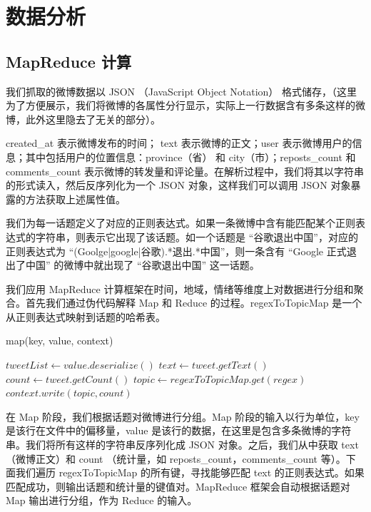 \section{数据分析}
\subsection{MapReduce 计算}
我们抓取的微博数据以 JSON （JavaScript Object Notation）\cite{json} 格式储存，（这里为了方便展示，我们将微博的各属性分行显示，实际上一行数据含有多条这样的微博，此外这里隐去了无关的部分）。



created\_at 表示微博发布的时间； text 表示微博的正文；user 表示微博用户的信息；其中包括用户的位置信息：province（省） 和 city（市）；reposts\_count 和 comments\_count 表示微博的转发量和评论量。在解析过程中，我们将其以字符串的形式读入，然后反序列化为一个 JSON 对象，这样我们可以调用 JSON 对象暴露的方法获取上述属性值。

我们为每一话题定义了对应的正则表达式。如果一条微博中含有能匹配某个正则表达式的字符串，则表示它出现了该话题。如一个话题是 “谷歌退出中国”，对应的正则表达式为 “(Goolge|google|谷歌).*退出.*中国”，则一条含有 “Google 正式退出了中国” 的微博中就出现了 “谷歌退出中国” 这一话题。

我们应用 MapReduce 计算框架在时间，地域，情绪等维度上对数据进行分组和聚合。首先我们通过伪代码解释 Map 和 Reduce 的过程。regexToTopicMap 是一个从正则表达式映射到话题的哈希表。

\begin{algorithm}
\caption{map(key, value, context)}
\label{alg1}
\begin{algorithmic}[1]
\STATE $tweetList \leftarrow value.deserialize()$
\STATE $text \leftarrow tweet.getText()$
\STATE $count \leftarrow tweet.getCount()$
\STATE $topic \leftarrow regexToTopicMap.get(regex)$
\STATE $context.write(topic, count)$
\ENDIF
\ENDFOR
\ENDFOR
\end{algorithmic}	
\end{algorithm}

在 Map 阶段，我们根据话题对微博进行分组。Map 阶段的输入以行为单位，key 是该行在文件中的偏移量，value 是该行的数据，在这里是包含多条微博的字符串。我们将所有这样的字符串反序列化成 JSON 对象。之后，我们从中获取 text （微博正文）和 count （统计量，如 reposts\_count，comments\_count 等）。下面我们遍历 regexToTopicMap 的所有键，寻找能够匹配 text 的正则表达式。如果匹配成功，则输出话题和统计量的键值对。MapReduce 框架会自动根据话题对 Map 输出进行分组，作为 Reduce 的输入。


